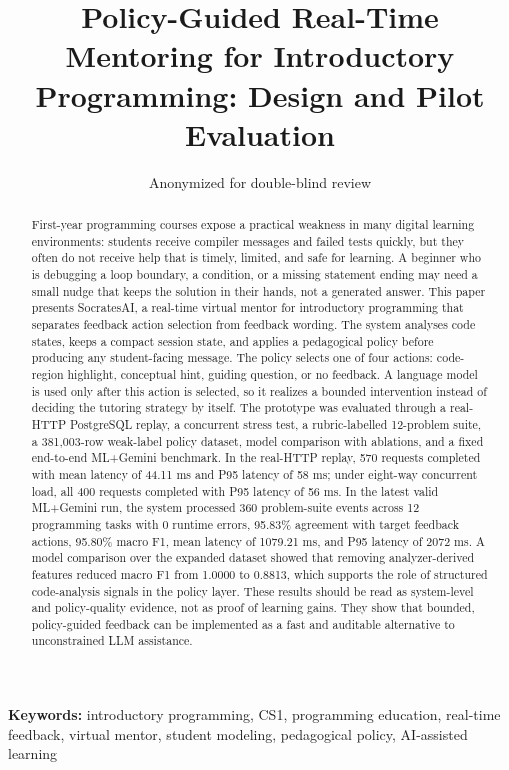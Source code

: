 \documentclass[11pt]{article}
\title{Policy-Guided Real-Time Mentoring for Introductory Programming: Design and Pilot Evaluation}
\author{Anonymized for double-blind review}
\date{}
\begin{document}
\maketitle

\begin{abstract}
First-year programming courses expose a practical weakness in many digital learning environments: students receive compiler messages and failed tests quickly, but they often do not receive help that is timely, limited, and safe for learning. A beginner who is debugging a loop boundary, a condition, or a missing statement ending may need a small nudge that keeps the solution in their hands, not a generated answer. This paper presents SocratesAI, a real-time virtual mentor for introductory programming that separates feedback action selection from feedback wording. The system analyses code states, keeps a compact session state, and applies a pedagogical policy before producing any student-facing message. The policy selects one of four actions: code-region highlight, conceptual hint, guiding question, or no feedback. A language model is used only after this action is selected, so it realizes a bounded intervention instead of deciding the tutoring strategy by itself. The prototype was evaluated through a real-HTTP PostgreSQL replay, a concurrent stress test, a rubric-labelled 12-problem suite, a 381,003-row weak-label policy dataset, model comparison with ablations, and a fixed end-to-end ML+Gemini benchmark. In the real-HTTP replay, 570 requests completed with mean latency of 44.11 ms and P95 latency of 58 ms; under eight-way concurrent load, all 400 requests completed with P95 latency of 56 ms. In the latest valid ML+Gemini run, the system processed 360 problem-suite events across 12 programming tasks with 0 runtime errors, 95.83\% agreement with target feedback actions, 95.80\% macro F1, mean latency of 1079.21 ms, and P95 latency of 2072 ms. A model comparison over the expanded dataset showed that removing analyzer-derived features reduced macro F1 from 1.0000 to 0.8813, which supports the role of structured code-analysis signals in the policy layer. These results should be read as system-level and policy-quality evidence, not as proof of learning gains. They show that bounded, policy-guided feedback can be implemented as a fast and auditable alternative to unconstrained LLM assistance.
\end{abstract}

\noindent\textbf{Keywords:} introductory programming, CS1, programming education, real-time feedback, virtual mentor, student modeling, pedagogical policy, AI-assisted learning
\end{document}
